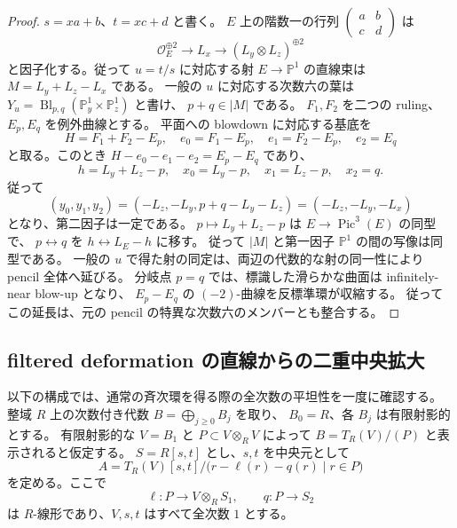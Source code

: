\begin{proof}
$s=xa+b$、$t=xc+d$ と書く。
$E$ 上の階数一の行列
$\left(\begin{smallmatrix}a&b\\c&d\end{smallmatrix}\right)$ は
\[
 \mathcal O_E^{\oplus2}\longrightarrow L_x
 \longrightarrow(L_y\otimes L_z)^{\oplus2}
\]
と因子化する。従って $u=t/s$ に対応する射 $E\to\mathbb P^1$ の直線束は
$M=L_y+L_z-L_x$ である。
一般の $u$ に対応する次数六の葉は
$Y_u=\operatorname{Bl}_{p,q}(\mathbb P^1_y\times\mathbb P^1_z)$ と書け、
$p+q\in|M|$ である。
$F_1,F_2$ を二つの ruling、$E_p,E_q$ を例外曲線とする。
平面への blowdown に対応する基底を
\[
 H=F_1+F_2-E_p,\quad e_0=F_1-E_p,\quad
 e_1=F_2-E_p,\quad e_2=E_q
\]
と取る。このとき $H-e_0-e_1-e_2=E_p-E_q$ であり、
\[
 h=L_y+L_z-p,\quad x_0=L_y-p,\quad
 x_1=L_z-p,\quad x_2=q.
\]
従って
\[
 (y_0,y_1,y_2)=(-L_z,-L_y,p+q-L_y-L_z)
 =(-L_z,-L_y,-L_x)
\]
となり、第二因子は一定である。
$p\mapsto L_y+L_z-p$ は $E\to\operatorname{Pic}^3(E)$ の同型で、
$p\leftrightarrow q$ を $h\leftrightarrow L_E-h$ に移す。
従って $|M|$ と第一因子 $\mathbb P^1$ の間の写像は同型である。
一般の $u$ で得た射の同定は、両辺の代数的な射の同一性により pencil 全体へ延びる。
分岐点 $p=q$ では、標識した滑らかな曲面は infinitely-near blow-up となり、
$E_p-E_q$ の $(-2)$-曲線を反標準環が収縮する。
従ってこの延長は、元の pencil の特異な次数六のメンバーとも整合する。
\end{proof}

\subsection{filtered deformation の直線からの二重中央拡大}
\label{pencil:subsec:central-extension}

以下の構成では、通常の斉次環を得る際の全次数の平坦性を一度に確認する。
整域 $R$ 上の次数付き代数 $B=\bigoplus_{j\geq0}B_j$ を取り、
$B_0=R$、各 $B_j$ は有限射影的とする。
有限射影的な $V=B_1$ と $P\subset V\otimes_RV$ によって
$B=T_R(V)/(P)$ と表示されると仮定する。
$S=R[s,t]$ とし、$s,t$ を中央元として
\begin{equation}\label{pencil:eq:two-parameter-presentation}
 A=
 T_R(V)[s,t]\big/
 \bigl(r-\ell(r)-q(r)\mid r\in P\bigr)
\end{equation}
を定める。ここで
\[
 \ell:P\longrightarrow V\otimes_R S_1,
 \qquad q:P\longrightarrow S_2
\]
は $R$-線形であり、$V,s,t$ はすべて全次数 $1$ とする。

